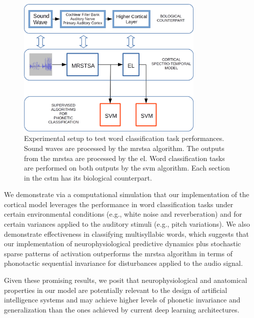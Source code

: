 \documentclass[10pt,letterpaper]{article}
\begin{document}
\begin{figure}[h!]
    \centering
    \includegraphics[width=0.8\textwidth]{Experiment.png}
    \caption{Experimental setup to test word classification task performances.
    Sound waves are processed by the \gls{mrstsa} algorithm.
    The outputs from the \gls{mrstsa} are processed by the \gls{el}.
    Word classification tasks are performed on both outputs by the \gls{svm} algorithm.
    Each section in the \gls{cstm} has its biological counterpart.}
    \label{fig:Experiment}
\end{figure}

\pagebreak

We demonstrate via a computational simulation that our implementation of the cortical model leverages the performance in word classification tasks under certain environmental conditions (e.g., white noise and reverberation) and for certain variances applied to the auditory stimuli (e.g., pitch variations). We also demonstrate effectiveness in classifying multisyllabic words, which suggests that our implementation of neurophysiological predictive dynamics plus stochastic sparse patterns of activation outperforms the \gls{mrstsa} algorithm in terms of phonotactic sequential invariance for disturbances applied to the audio signal. 

Given these promising results, we posit that neurophysiological and anatomical properties in our model are potentially relevant to the design of artificial intelligence systems and may achieve higher levels of phonetic invariance and generalization than the ones achieved by current deep learning architectures.

\end{document}

